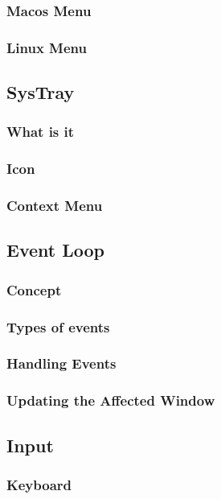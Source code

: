 \documentclass[11pt, letterpaper]{article}
\begin{document}
\subsubsection{Macos Menu}
\blindtext
\subsubsection{Linux Menu}
\blindtext

\subsection{SysTray}
\blindtext
\subsubsection{What is it}
\blindtext
\subsubsection{Icon}
\blindtext
\subsubsection{Context Menu}
\blindtext

\subsection{Event Loop}
\blindtext
\subsubsection{Concept}
\blindtext
\subsubsection{Types of events}
\blindtext
\subsubsection{Handling Events}
\blindtext
\subsubsection{Updating the Affected Window}
\blindtext

\subsection{Input}
\blindtext
\subsubsection{Keyboard}
\blindtext
\end{document}
